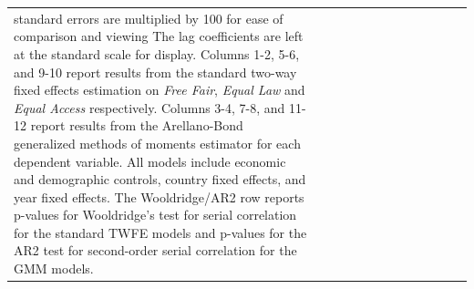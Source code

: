 \begin{table}
\begin{tabular}{@{\extracolsep{2pt}}lcccccccccccc}
{{            standard errors are multiplied by 100 for ease of comparison and
            viewing The lag coefficients are left at the standard scale for
            display. Columns 1-2, 5-6, and 9-10 report results from the standard
            two-way fixed effects estimation on \textit{Free Fair},
            \textit{Equal Law} and \textit{Equal Access} respectively. Columns
            3-4, 7-8, and 11-12 report results from the Arellano-Bond
            generalized methods of moments estimator for each dependent
            variable. All models include economic and demographic controls, country fixed
            effects, and year fixed effects. The Wooldridge/AR2 row reports
            p-values for Wooldridge's test for serial correlation for the
            standard TWFE models and p-values for the AR2 test for second-order
            serial correlation for the GMM models.}} \\ 
\end{tabular} 
\end{table} 
